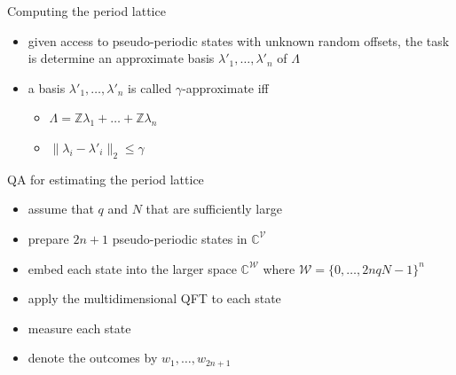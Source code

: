 \documentclass[slideColor]{prosper}
\renewcommand{\>}{\rangle}
\newcommand{\<}{\langle}
\begin{document}

\begin{slide}{Computing the period lattice}

\begin{itemize}
\item given access to pseudo-periodic states with unknown random offsets, the task is determine an approximate
basis $\lambda'_1,\ldots,\lambda'_n$ of $\Lambda$

\medskip
\item 
a basis $\lambda'_1,\ldots,\lambda'_n$ is called $\gamma$-approximate iff

\begin{itemize}
\medskip
\item $\Lambda=\mathbb{Z}\lambda_1 + \ldots + \mathbb{Z} \lambda_n$ 

\medskip
\item $\|\lambda_i - \lambda'_i \|_2 \le \gamma$
\end{itemize}
\end{itemize}

\end{slide}


\begin{slide}{QA for estimating the period lattice}

\begin{itemize}

\item assume that $q$ and $N$ that are sufficiently large

\medskip
\item prepare $2n+1$ pseudo-periodic states in $\mathbb{C}^{\mathcal{V}}$ 

\medskip
\item embed each state into the larger space $\mathbb{C}^\mathcal{W}$ where $\mathcal{W}=\{0,\ldots,2nqN-1\}^n$

\medskip
\item apply the multidimensional QFT to each state

\medskip
\item measure each state

\medskip
\item denote the outcomes by $w_1,\ldots,w_{2n+1}$

\end{itemize}
\end{slide}
\end{document}
